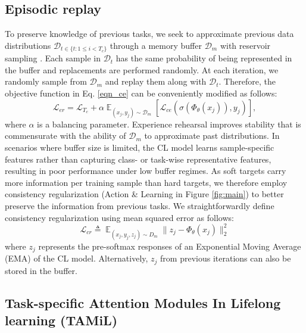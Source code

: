 \documentclass{article} %
\begin{document}
\subsection{Episodic replay}
To preserve knowledge of previous tasks, we seek to approximate previous data distributions $\mathcal{D}_{t \in \{t: 1 \leq i<T_{c}\}}$ through a memory buffer $\mathcal{D}_m$ with reservoir sampling \citep{vitter1985random}. Each sample in $\mathcal{D}_t$ has the same probability of being represented in the buffer and replacements are performed randomly.  At each iteration, we randomly sample from $\mathcal{D}_m$ and replay them along with $\mathcal{D}_t$. Therefore, the objective function in Eq. \ref{eqn_ce} can be conveniently modified as follows:
\begin{equation}
    \mathcal{L}_{er} = \mathcal{L}_{T_{c}} + \alpha \displaystyle \mathop{\mathbb{E}}_{(x_{j}, y_{j}) \sim \mathcal{D}_{m}} \left[ \mathcal{L}_{ce} (\sigma (\Phi_{\theta}(x_{j})), y_{j}) \right],
\label{eqn_er}
\end{equation}
where $\alpha$ is a balancing parameter. Experience rehearsal improves stability that is commensurate with the ability of $\mathcal{D}_m$ to approximate past distributions. In scenarios where buffer size is limited, the CL model learns sample-specific features rather than capturing class- or task-wise representative features, resulting in poor performance under low buffer regimes. As soft targets carry more information per training sample than hard targets, we therefore employ consistency regularization \cite{bhat2022consistency} (Action \& Learning in Figure \ref{fig:main}) to better preserve the information from previous tasks. We straightforwardly define consistency regularization using mean squared error as follows:
\begin{equation}
\label{eqn_cr}
    \mathcal{L}_{cr} \triangleq \displaystyle \mathop{\mathbb{E}}_{(x_j, y_j, z_j) \sim D_{m}} \lVert {z_j} - \Phi_{\theta}(x_{j}) \rVert^2_2
\end{equation}
where ${z_j}$ represents the pre-softmax responses of an Exponential Moving Average (EMA) of the CL model. Alternatively, ${z_j}$ from previous iterations can also be stored in the buffer. 


\subsection{Task-specific Attention Modules In Lifelong learning (TAMiL)}
\label{tamil} 
\end{document}
